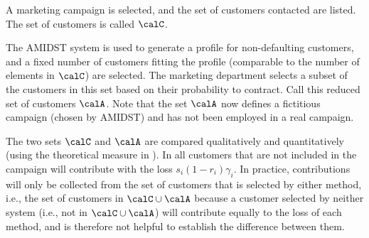 \documentclass{article}
\theoremstyle{theorem}
\theoremstyle{definition}
\begin{document}
\begin{description}
\ben
\item A marketing campaign is selected, and the set of customers contacted are listed. The set of customers is called $\calC$.
\item The AMIDST system is used to generate a profile for non-defaulting customers, and a fixed number of  customers fitting the profile (comparable to the number of elements in $\calC$) are selected.
 The marketing department selects a subset of the customers in this set based on their probability to contract. Call this reduced set of customers $\calA$. Note that the set $\calA$ now defines a fictitious campaign (chosen by AMIDST) and has not been employed in a real campaign. 
\item The two sets $\calC$ and $\calA$ are compared qualitatively and quantitatively (using the theoretical measure in ).
\een
In  all customers that are not included in the campaign will contribute with the loss $s_i (1-r_i)\gamma_i$. In practice, contributions will only be collected from the set of customers that is selected by either method, i.e., the set of customers in $\calC\cup\calA$ because a customer selected by neither system (i.e., not in $\calC\cup\calA$) will  contribute equally to the loss of each method, and is therefore not helpful to establish the difference between them. 

\item [2) EVALUATION OF DEFAULTING BEHAVIOUR:]


\end{description}
\end{document}

